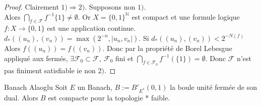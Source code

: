 \begin{proof}
    Clairement $1)\Rightarrow 2).$ Supposons non $1).$ \\
    Alors $\bigcap\limits_{f\in \mathcal{F}} f^{-1} \{1\} \neq \emptyset .$ Or $X=  \{0,1\} ^\mathbb{N} $ est compact et une formule logique $f:X\to \{0,1\} $ est une application continue. $d_*\left( (u_n),(v_n) \right) =\max(2^{-n}, |u_n,v_n| ).$ Si $d_*\left( (u_n),(v_n) \right)<2^{-N(f)}$ Alors $f\left( (u_n) \right) =f\left( (v_n) \right) .$  Donc par la propriété de Borel Lebesgue appliqué aux fermés, $\exists \mathcal{F_0}\subset \mathcal{F},\ \mathcal{F_0}$ fini et $\bigcap\limits_{f\in \mathcal{F_0}} f^{-1} (\{1\})=\emptyset . $ Donc $\mathcal{F}$ n'est pas finiment satisfiable ie non $2)$.
\end{proof}
\begin{theoreme}{Banach Alaoglu}
    Soit $E$ un Banach, $B:=B'_{E^*}(0,1)$ la boule unité fermée de son dual. Alors $B$ est compacte pour la topologie * faible.
\end{theoreme}
